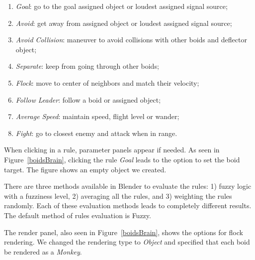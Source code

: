 \begin{enumerate}
\item{\textit{Goal}: go to the goal assigned object or loudest assigned signal source;}
\item{\textit{Avoid}: get away from assigned object or loudest assigned signal source;}
\item{\textit{Avoid Collision}: maneuver to avoid collisions with other boids and deflector object;} %
\item{\textit{Separate}: keep from going through other boids;}
\item{\textit{Flock}: move to center of neighbors and match their velocity;}
\item{\textit{Follow Leader}: follow a boid or assigned object;}
\item{\textit{Average Speed}: maintain speed, flight level or wander;}
\item{\textit{Fight}: go to closest enemy and attack when in range}.
\end{enumerate}

When clicking in a rule, parameter panels appear if needed. As seen in Figure~\ref{boidsBrain}, clicking the rule \textit{Goal} leads to the option to set the boid target. The figure shows an empty object we created. 

There are three methods available in Blender to evaluate the rules: 1) fuzzy logic with a fuzziness level, 2) averaging all the rules, and 3) weighting the rules randomly. Each of these evaluation methods leads to completely different results. The default method of rules evaluation is Fuzzy.

The render panel, also seen in Figure~\ref{boidsBrain}, shows the options for flock rendering. We changed the rendering type to \textit{Object} and specified that each boid be rendered as a \textit{Monkey}.

